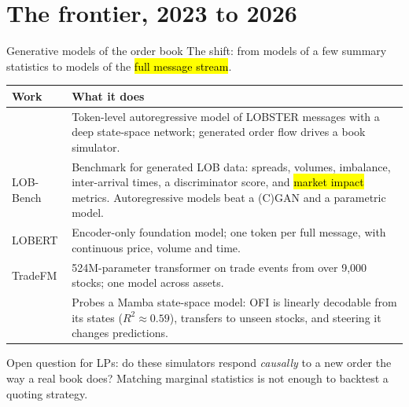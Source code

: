\section{The frontier, 2023 to 2026}

\begin{frame}{Generative models of the order book}
  \footnotesize
  The shift: from models of a few summary statistics to models of the \hl{full message stream}.
  \vspace{0.3em}

  \begin{tabular}{p{}p{}}
    \toprule
    Work & What it does \\
    \midrule
    \citet{nagy2023generative} & Token-level autoregressive model of LOBSTER messages with a deep state-space network; generated order flow drives a book simulator. \\
    LOB-Bench \citep{nagy2025lobbench} & Benchmark for generated LOB data: spreads, volumes, imbalance, inter-arrival times, a discriminator score, and \hl{market impact} metrics. Autoregressive models beat a (C)GAN and a parametric model. \\
    LOBERT \citep{linna2025lobert} & Encoder-only foundation model; one token per full message, with continuous price, volume and time. \\
    TradeFM \citep{kawawa2026tradefm} & 524M-parameter transformer on trade events from over 9,000 stocks; one model across assets. \\
    \citet{mohl2026understanding} & Probes a Mamba state-space model: OFI is linearly decodable from its states ($R^2\approx 0.59$), transfers to unseen stocks, and steering it changes predictions. \\
    \bottomrule
  \end{tabular}
  \vspace{0.3em}

  Open question for LPs: do these simulators respond \emph{causally} to a new order the way a real book does? Matching marginal statistics is not enough to backtest a quoting strategy.
\end{frame}

